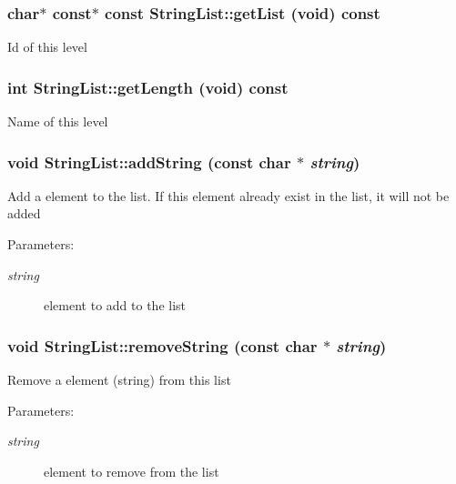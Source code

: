 \subsubsection{\setlength{\rightskip}{0pt plus 5cm}char$\ast$ const$\ast$ const StringList::getList (void) const\hspace{0.3cm}{\tt  [inline]}}\label{classStringList_4f1002c2e4fc168a4acefb9000cca8a0}


Id of this level 
\subsubsection{\setlength{\rightskip}{0pt plus 5cm}int StringList::getLength (void) const\hspace{0.3cm}{\tt  [inline]}}\label{classStringList_f4806ee157e0a2f5c657be3cdffa8411}


Name of this level 
\subsubsection{\setlength{\rightskip}{0pt plus 5cm}void StringList::addString (const char $\ast$ {\em string})}\label{classStringList_a09c31af8eed07163aa82f148bed18a5}


Add a element to the list. If this element already exist in the list, it will not be added \begin{Desc}
\item[Parameters:]
\begin{description}
\item[{\em string}]element to add to the list \end{description}
\end{Desc}
\subsubsection{\setlength{\rightskip}{0pt plus 5cm}void StringList::removeString (const char $\ast$ {\em string})}\label{classStringList_93cbcea629bc4e90b64053df0c081bc1}


Remove a element (string) from this list \begin{Desc}
\item[Parameters:]
\begin{description}
\item[{\em string}]element to remove from the list \end{description}
\end{Desc}
